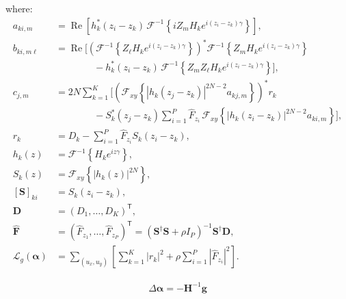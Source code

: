 \documentclass{article}
\begin{document}
where:
\begin{align*}
a_{ki,m}
&=
\operatorname{Re}\left[
h_k^*(z_i-z_k)\,
\mathcal F^{-1}
\left\{
iZ_mH_k e^{i(z_i-z_k)\gamma}
\right\}
\right],
\\[6pt]
b_{ki,m\ell}
&=
\operatorname{Re}\Bigg[
\left(
\mathcal F^{-1}
\left\{
Z_\ell H_k e^{i(z_i-z_k)\gamma}
\right\}
\right)^*
\mathcal F^{-1}
\left\{
Z_mH_k e^{i(z_i-z_k)\gamma}
\right\}
\\
&\qquad\qquad-
h_k^*(z_i-z_k)\,
\mathcal F^{-1}
\left\{
Z_mZ_\ell H_k e^{i(z_i-z_k)\gamma}
\right\}
\Bigg],
\\[6pt]
c_{j,m}
&=
2N\sum_{k=1}^{K}\Bigg[
\left(
\mathcal F_{xy}
\left\{
|h_k(z_j-z_k)|^{2N-2}a_{kj,m}
\right\}
\right)^*r_k
\\
&\qquad\qquad-
S_k^*(z_j-z_k)
\sum_{i=1}^{P}\widehat F_{z_i}\,
\mathcal F_{xy}
\left\{
|h_k(z_i-z_k)|^{2N-2}a_{ki,m}
\right\}
\Bigg],
\\[6pt]
r_k
&=
D_k-\sum_{i=1}^{P}\widehat F_{z_i}S_k(z_i-z_k),
\\[6pt]
h_k(z)
&=
\mathcal F^{-1}\left\{H_k e^{iz\gamma}\right\},
\\[6pt]
S_k(z)
&=
\mathcal F_{xy}\left\{|h_k(z)|^{2N}\right\},
\\[6pt]
[\mathbf S]_{ki}
&=
S_k(z_i-z_k),
\\[6pt]
\mathbf D
&=
(D_1,\ldots,D_K)^{\mathsf T},
\\[6pt]
\widehat{\mathbf F}
&=
(\widehat F_{z_1},\ldots,\widehat F_{z_P})^{\mathsf T}
=
\left(\mathbf S^\dagger\mathbf S+\rho I_P\right)^{-1}
\mathbf S^\dagger\mathbf D,
\\[6pt]
\mathcal{L}_g(\bm{\alpha})
&=
\sum_{(u_x,u_y)}
\left[
\sum_{k=1}^{K}|r_k|^2
+\rho\sum_{i=1}^{P}|\widehat F_{z_i}|^2
\right].
\end{align*}

\begin{align}
\Delta \mathbf{\alpha} = -\mathbf{H}^{-1} \mathbf{g}
\end{align}
\end{document}
